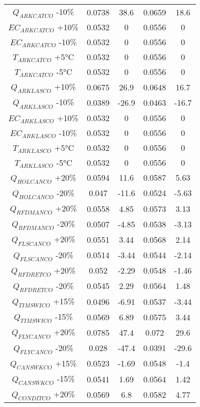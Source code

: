 \begin{linenumbers}
\begin{spacing}{1.0}
\begin{center}
\begin{longtable}{ccccc}
			$Q_{ARKCATCO} $ -10\% & 0.0738 & 38.6 & 0.0659 & 18.6 \\
			$EC_{ARKCATCO} $ +10\% & 0.0532 & 0 & 0.0556 & 0 \\
			$EC_{ARKCATCO} $ -10\% & 0.0532 & 0 & 0.0556 & 0 \\
			$T_{ARKCATCO} $ +5\si{\degreeCelsius} & 0.0532 & 0 & 0.0556 & 0 \\
			$T_{ARKCATCO} $ -5\si{\degreeCelsius} & 0.0532 & 0 & 0.0556 & 0 \\
			$Q_{ARKLASCO} $ +10\% & 0.0675 & 26.9 & 0.0648 & 16.7 \\
			$Q_{ARKLASCO} $ -10\% & 0.0389 & -26.9 & 0.0463 & -16.7 \\
			$EC_{ARKLASCO} $ +10\% & 0.0532 & 0 & 0.0556 & 0 \\
			$EC_{ARKLASCO} $ -10\% & 0.0532 & 0 & 0.0556 & 0 \\
			$T_{ARKLASCO} $ +5\si{\degreeCelsius} & 0.0532 & 0 & 0.0556 & 0 \\
			$T_{ARKLASCO} $ -5\si{\degreeCelsius} & 0.0532 & 0 & 0.0556 & 0 \\
			$Q_{HOLCANCO} $ +20\% & 0.0594 & 11.6 & 0.0587 & 5.63 \\
			$Q_{HOLCANCO} $ -20\% & 0.047 & -11.6 & 0.0524 & -5.63 \\
			$Q_{RFDMANCO} $ +20\% & 0.0558 & 4.85 & 0.0573 & 3.13 \\
			$Q_{RFDMANCO} $ -20\% & 0.0507 & -4.85 & 0.0538 & -3.13 \\
			$Q_{FLSCANCO} $ +20\% & 0.0551 & 3.44 & 0.0568 & 2.14 \\
			$Q_{FLSCANCO} $ -20\% & 0.0514 & -3.44 & 0.0544 & -2.14 \\
			$Q_{RFDRETCO} $ +20\% & 0.052 & -2.29 & 0.0548 & -1.46 \\
			$Q_{RFDRETCO} $ -20\% & 0.0545 & 2.29 & 0.0564 & 1.48 \\
			$Q_{TIMSWICO} $ +15\% & 0.0496 & -6.91 & 0.0537 & -3.44 \\
			$Q_{TIMSWICO} $ -15\% & 0.0569 & 6.89 & 0.0575 & 3.44 \\
			$Q_{FLYCANCO} $ +20\% & 0.0785 & 47.4 & 0.072 & 29.6 \\
			$Q_{FLYCANCO} $ -20\% & 0.028 & -47.4 & 0.0391 & -29.6 \\
			$Q_{CANSWKCO} $ +15\% & 0.0523 & -1.69 & 0.0548 & -1.4 \\
			$Q_{CANSWKCO} $ -15\% & 0.0541 & 1.69 & 0.0564 & 1.42 \\
			$Q_{CONDITCO} $ +20\% & 0.0569 & 6.8 & 0.0582 & 4.77 \\

\end{longtable}
\end{center}
\end{spacing}
\end{linenumbers}
